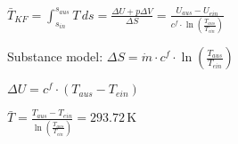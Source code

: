 \( \bar{T}_{KF} = \int_{s_{in}}^{s_{aus}} T \, ds = \frac{\Delta U + p \Delta V}{\Delta S} = \frac{U_{aus} - U_{ein}}{c^f \cdot \ln \left( \frac{T_{aus}}{T_{ein}} \right)} \)  

Substance model:  
\( \Delta S = \dot{m} \cdot c^f \cdot \ln \left( \frac{T_{aus}}{T_{ein}} \right) \)  

\( \Delta U = c^f \cdot (T_{aus} - T_{ein}) \)  

\( \bar{T} = \frac{T_{aus} - T_{ein}}{\ln \left( \frac{T_{aus}}{T_{ein}} \right)} = 293.72 \, \text{K} \)